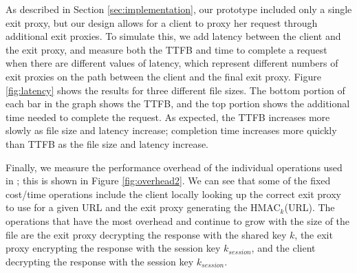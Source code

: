
As described in Section \ref{sec:implementation}, our prototype included only a single exit proxy, but 
our design allows for a client to proxy her request through additional exit proxies.  To simulate this, we 
add latency between the client and the exit proxy, and measure both the TTFB and time to complete a request 
when there are different values of latency, which represent different numbers of exit proxies on the path between the 
client and the final exit proxy.  Figure \ref{fig:latency} shows the results for three different file sizes. The 
bottom portion of each bar in the graph shows the TTFB, and the top portion shows the additional time needed 
to complete the request.  As expected, the TTFB increases more slowly as file size
and latency increase; completion time
increases more quickly than TTFB as the file size and latency increase.   


Finally, we measure the performance overhead of the individual operations used in
\system{}; this is shown in Figure \ref{fig:overhead2}. %
We can see that some of the fixed cost/time 
operations include the client locally looking up the correct exit proxy to use for a given URL and the exit proxy generating the 
HMAC$_{k}$(URL).  The operations that have the most overhead and continue to grow with the size of the file are the exit proxy decrypting 
the response with the shared key $k$, the exit proxy encrypting the response with the session key $k_{session}$, and the client 
decrypting the response with the session key $k_{session}$.


